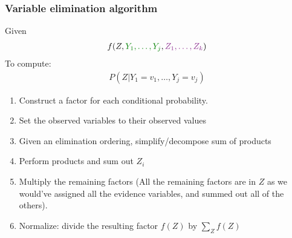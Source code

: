 \documentclass{article}
\def\blu#1{{\color{blu}#1}}
\def\gre#1{{\color{gre}#1}}
\begin{document}
\subsubsection*{Variable elimination algorithm}
Given 
\begin{align*}
f(Z, \gre{Y_1, \dots , Y_j}, {\color{Fuchsia}Z_1, \dots, Z_k})
\end{align*}
To compute:
\begin{align*}
P(Z | Y_1 = v_1, \dots, Y_j = v_j)
\end{align*}
\begin{enumerate}
	\item \blu{Construct a factor} for each conditional probability.
	\item Set the \blu{observed variables} to their observed values
	\item Given an \blu{elimination ordering, simplify/decompose} sum of products
	\item \blu{Perform products} and \blu{sum out} $ Z_i $
	\item \blu{Multiply} the remaining factors (All the remaining factors are in $ Z $ as we would've assigned all the evidence variables, and summed out all of the others).
	\item \blu{Normalize}: divide the resulting factor $ f(Z) $ by $ \sum_Z f(Z) $
\end{enumerate}
\end{document}
